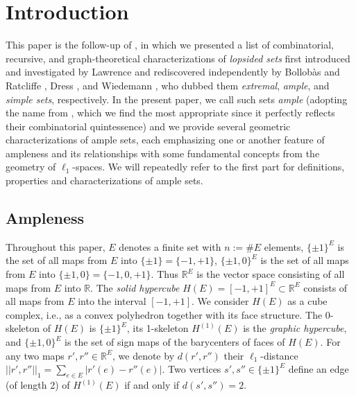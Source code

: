 \documentclass[11pt,a4paper]{amsart}
\theoremstyle{definition}
\numberwithin{equation}{section}
\newcommand{\HH}{\ensuremath{H}}
\begin{document}
\maketitle


\section{Introduction}


This paper is the follow-up of \cite{BaChDrKo}, in which we presented  a list of  combinatorial, recursive,  and graph-theoretical  characterizations of
\emph{lopsided sets} first introduced and investigated by Lawrence \cite{La} and rediscovered independently by Bollob\`as and Ratcliffe \cite{BoRa}, Dress \cite{Dr}, and Wiedemann \cite{Wi}, who dubbed them \emph{extremal}, \emph{ample}, and \emph{simple sets}, respectively.
In the present paper, we call such sets \emph{ample} (adopting the name from \cite{Dr}, which we find the most appropriate since it perfectly reflects their combinatorial quintessence) and we provide  several geometric
characterizations of ample sets, each emphasizing one or
another feature of ampleness and its relationships with some fundamental
concepts from the geometry of
$\ell_1$-spaces. We will repeatedly refer to the first part \cite{BaChDrKo}
for definitions, properties and characterizations of ample  sets.

\subsection*{Ampleness} Throughout this paper, $E$  denotes a finite set with
$n:=\#E$ elements,   $\{ \pm 1\}^E$ is  the set  of all maps from  $E$
into $\{ \pm 1\}=\{ -1,+1\}$, $\{ \pm 1, 0\}^E$ is  the set  of all maps from  $E$
into  $\{ \pm 1, 0\}=\{ -1,0,+1\}$. Thus  ${\mathbb R}^E$ is the vector space consisting of all maps from $E$ into $\mathbb R$. The \emph{solid hypercube}
$\HH(E)=[-1,+1]^E\subset {\mathbb R}^E$ consists of all maps from $E$ into
the interval $[-1,+1]$. We consider $\HH(E)$ as a cube complex, i.e., as a convex polyhedron together with its face structure. %
The 0-skeleton of $\HH(E)$ is $\{ \pm 1\}^E$, its 1-skeleton ${\HH}^{(1)}(E)$ is the \emph{graphic hypercube}, and $\{ \pm 1, 0\}^E$ is the set of sign maps of the barycenters of faces of $\HH(E)$. For any two maps $r',r''\in {\mathbb R}^E$, we denote by
$d(r',r'')$ their $\ell_1$-distance $||r',r''||_1=\sum_{e\in E} |r'(e)-r''(e)|$. Two vertices $s',s''\in \{ \pm 1\}^E$ define an edge (of length 2) of  ${\HH}^{(1)}(E)$
if and only if $d(s',s'')=2.$
\end{document}
